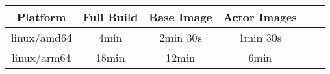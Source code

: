 \begin{changemargin}{0cm}{0cm}
    \centering
    \begin{tabular}{|c|c|c|c|c|c|}
        \hline
            \textbf{Platform} & \textbf{Full Build} & \textbf{Base Image} & \textbf{Actor Images} \\
        \hline
            linux/amd64 & 4min & 2min 30s & 1min 30s \\
        \hline
            linux/arm64 & 18min & 12min & 6min 
        \\
        \hline
    \end{tabular}
    \label{table:sklearn_mnist_build_example}
\end{changemargin}
